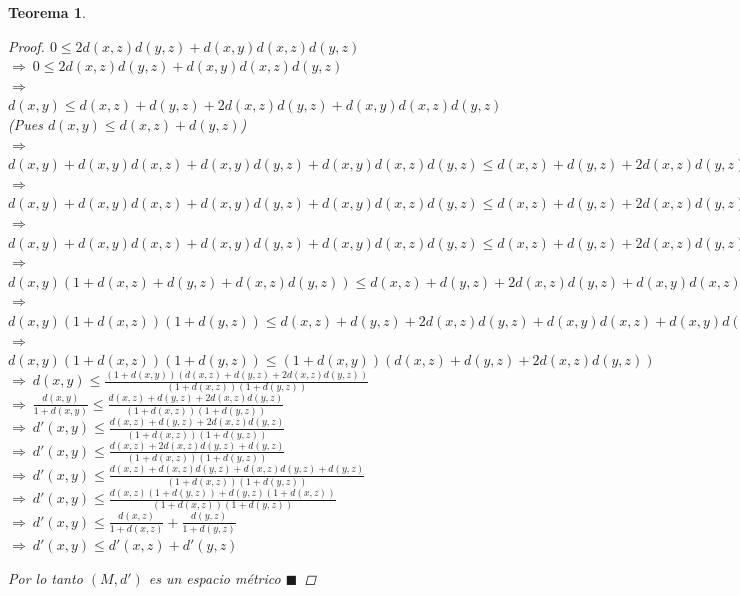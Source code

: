 \documentclass[oneside]{book} %
\theoremstyle{Teorema}
\newtheorem{Teorema}[Definicion]{Teorema}
\theoremstyle{Ejemplos}
\theoremstyle{[Obs]}
\renewcommand{\{}{\left\lbrace} %
\renewcommand{\}}{\right\rbrace} %
\renewcommand{\qed}{$\blacksquare$} %
\newcommand{\Imp}{$\Rightarrow\ $} %
\begin{document}
\begin{Teorema}
\begin{proof}
					$0 \leq 2d(x, z)d(y, z) + d(x, y)d(x, z)d(y, z)$ \\
					\Imp $0 \leq 2d(x, z)d(y, z) + d(x, y)d(x, z)d(y, z)$ \\
					\Imp $d(x, y) \leq d(x, z) + d(y, z) + 2d(x, z)d(y, z) + d(x, y)d(x, z)d(y, z)$ (Pues $d(x, y) \leq d(x, z) + d(y, z)$) \\
					\Imp $d(x, y) + d(x, y)d(x, z) + d(x, y)d(y, z) + d(x, y)d(x, z)d(y, z) \leq d(x, z) + d(y, z) + 2d(x, z)d(y, z) + d(x, y)d(x, z)d(y, z) + d(x, y)d(x, z) + d(x, y)d(y, z) + d(x, y)d(x, z)d(y, z)$ \\
					\Imp $d(x, y) + d(x, y)d(x, z) + d(x, y)d(y, z) + d(x, y)d(x, z)d(y, z) \leq d(x, z) + d(y, z) + 2d(x, z)d(y, z) + d(x, y)d(x, z) + d(x, y)d(y, z) + d(x, y)d(x, z)d(y, z) + d(x, y)d(x, z)d(y, z)$ \\
					\Imp $d(x, y) + d(x, y)d(x, z) + d(x, y)d(y, z) + d(x, y)d(x, z)d(y, z) \leq d(x, z) + d(y, z) + 2d(x, z)d(y, z) + d(x, y)d(x, z) + d(x, y)d(y, z) + 2d(x, y)d(x, z)d(y, z)$ \\
					\Imp $d(x, y)(1 + d(x, z) + d(y, z) + d(x, z)d(y, z)) \leq d(x, z) + d(y, z) + 2d(x, z)d(y, z) + d(x, y)d(x, z) + d(x, y)d(y, z) + 2d(x, y)d(x, z)d(y, z)$ \\
					\Imp $d(x, y)(1 + d(x, z))(1 + d(y, z)) \leq d(x, z) + d(y, z) + 2d(x, z)d(y, z) + d(x, y)d(x, z) + d(x, y)d(y, z) + 2d(x, y)d(x, z)d(y, z)$ \\
					\Imp $d(x, y)(1 + d(x, z))(1 + d(y, z)) \leq (1 + d(x, y))(d(x, z) + d(y, z) + 2d(x, z)d(y, z))$ \\
					\Imp $d(x, y) \leq \frac{(1 + d(x, y))(d(x, z) + d(y, z) + 2d(x, z)d(y, z))}{(1 + d(x, z))(1 + d(y, z))}$ \\
					\Imp $\frac{d(x, y)}{1 + d(x, y)} \leq \frac{d(x, z) + d(y, z) + 2d(x, z)d(y, z)}{(1 + d(x, z))(1 + d(y, z))}$ \\
					\Imp $d'(x, y) \leq \frac{d(x, z) + d(y, z) + 2d(x, z)d(y, z)}{(1 + d(x, z))(1 + d(y, z))}$ \\
					\Imp $d'(x, y) \leq \frac{d(x, z) + 2d(x, z)d(y, z) + d(y, z)}{(1 + d(x, z))(1 + d(y, z))}$ \\
					\Imp $d'(x, y) \leq \frac{d(x, z) + d(x, z)d(y, z) + d(x, z)d(y, z) + d(y, z)}{(1 + d(x, z))(1 + d(y, z))}$ \\
					\Imp $d'(x, y) \leq \frac{d(x, z)(1 + d(y, z)) + d(y, z)(1 + d(x, z))}{(1 + d(x, z))(1 + d(y, z))}$ \\
					\Imp $d'(x, y) \leq \frac{d(x, z)}{1 + d(x, z)} + \frac{d(y, z)}{1 + d(y, z)}$ \\
					\Imp $d'(x, y) \leq d'(x, z) + d'(y, z)$

					Por lo tanto $(M, d')$ es un espacio métrico \qed

				\end{proof}

			\end{Teorema}
\end{document}
